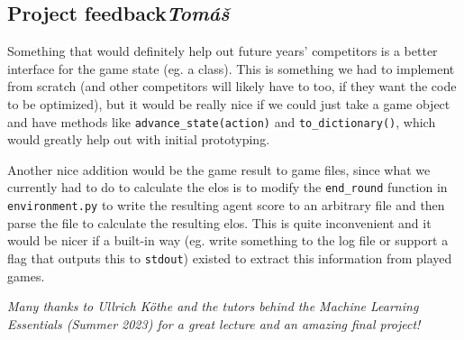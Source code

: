 \documentclass{article}
\begin{document}
\subsection[Project feedback]{Project feedback{\normalsize \normalfont \it \hfill Tomáš}}

Something that would definitely help out future years' competitors is a better interface for the game state (eg. a class).
This is something we had to implement from scratch (and other competitors will likely have to too, if they want the code to be optimized), but it would be really nice if we could just take a game object and have methods like \texttt{advance\_state(action)} and \texttt{to\_dictionary()}, which would greatly help out with initial prototyping.

Another nice addition would be the game result to game files, since what we currently had to do to calculate the elos is to modify the \texttt{end\_round} function in \texttt{environment.py} to write the resulting agent score to an arbitrary file and then parse the file to calculate the resulting elos.
This is quite inconvenient and it would be nicer if a built-in way (eg. write something to the log file or support a flag that outputs this to \texttt{stdout}) existed to extract this information from played games.

\clearpage

\printbibliography

\vfill
\hfill\begin{minipage}{40em}%
    \Large\it Many thanks to Ullrich Köthe and the tutors behind the Machine Learning Essentials (Summer 2023) for a great lecture and an amazing final project!%
\end{minipage}\hfill
\vspace{8em}
\end{document}
